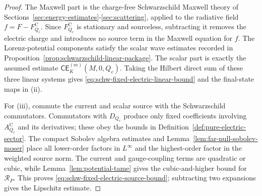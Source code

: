 \documentclass[11pt]{article}
\numberwithin{equation}{section}
\theoremstyle{plain}
\theoremstyle{definition}
\theoremstyle{remark}
\newcommand{\CElec}{\mathsf{CE}}
\begin{document}
\begin{proof}
The Maxwell part is the charge-free Schwarzschild Maxwell theory of Sections~\ref{sec:energy-estimates}-\ref{sec:scattering}, applied to the radiative field $f=F-F^{\mathrm C}_{Q_e}$.  Since $F^{\mathrm C}_{Q_e}$ is stationary and sourceless, subtracting it removes the electric charge and introduces no source term in the Maxwell equation for $f$.  The Lorenz-potential components satisfy the scalar wave estimates recorded in Proposition~\ref{prop:schwarzschild-linear-package}.  The scalar part is exactly the assumed estimate $\CElec^{(m)}_K(M,0,Q_e)$.  Taking the Hilbert direct sum of these three linear systems gives \eqref{eq:schw-fixed-electric-linear-bound} and the final-state maps in (ii).

For (iii), commute the current and scalar source with the Schwarzschild commutators.  Commutators with $D_{Q_e}$ produce only fixed coefficients involving $A^{\mathrm C}_{Q_e}$ and its derivatives; these obey the bounds in Definition~\ref{def:pure-electric-sector}.  The compact Sobolev algebra estimates and Lemma~\ref{lem:far-null-sobolev-moser} place all lower-order factors in $L^\infty$ and the highest-order factor in the weighted source norm.  The current and gauge-coupling terms are quadratic or cubic, while Lemma~\ref{lem:potential-tame} gives the cubic-and-higher bound for $\mathcal R_P$.  This proves \eqref{eq:schw-fixed-electric-source-bound}; subtracting two expansions gives the Lipschitz estimate.
\end{proof}
\end{document}
